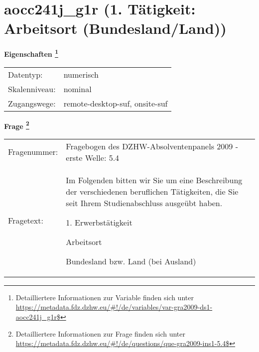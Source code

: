 
    \setcounter{footnote}{0}

    \vspace*{-1.8cm}
	\section{aocc241j\_g1r (1. Tätigkeit: Arbeitsort (Bundesland/Land))}
	\label{section:aocc241j_g1r}



    \vspace*{0.5cm}
    \noindent\textbf{Eigenschaften
	\footnote{Detailliertere Informationen zur Variable finden sich unter
		\url{https://metadata.fdz.dzhw.eu/\#!/de/variables/var-gra2009-ds1-aocc241j_g1r$}}}\\
	\begin{tabularx}{\hsize}{@{}lX}
	Datentyp: & numerisch \\
	Skalenniveau: & nominal \\
	Zugangswege: &
	  remote-desktop-suf, 
	  onsite-suf
 \\
    \end{tabularx}



				\vspace*{0.5cm}
                \noindent\textbf{Frage
	                \footnote{Detailliertere Informationen zur Frage finden sich unter
		              \url{https://metadata.fdz.dzhw.eu/\#!/de/questions/que-gra2009-ins1-5.4$}}}\\
				\begin{tabularx}{\hsize}{@{}lX}
					Fragenummer: &
					  Fragebogen des DZHW-Absolventenpanels 2009 - erste Welle:
					  5.4
 \\
					Fragetext: & Im Folgenden bitten wir Sie um eine Beschreibung der verschiedenen beruflichen Tätigkeiten, die Sie seit Ihrem Studienabschluss ausgeübt haben.\par  1. Erwerbstätigkeit\par  Arbeitsort\par  Bundesland bzw. Land (bei Ausland) \\
				\end{tabularx}





